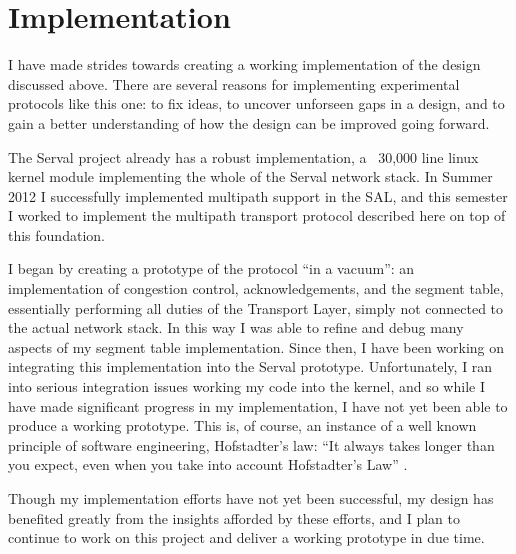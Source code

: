 \section{Implementation}
\label{sec:implementation}

I have made strides towards creating a working implementation of the design discussed above. There are several reasons for implementing experimental protocols like this one: to fix ideas, to uncover unforseen gaps in a design, and to gain a better understanding of how the design can be improved going forward.

The Serval project already has a robust implementation, a ~30,000 line linux kernel module implementing the whole of the Serval network stack. In Summer 2012 I successfully implemented multipath support in the SAL, and this semester I worked to implement the multipath transport protocol described here on top of this foundation.

I began by creating a prototype of the protocol ``in a vacuum'': an implementation of congestion control, acknowledgements, and the segment table, essentially performing all duties of the Transport Layer, simply not connected to the actual network stack. In this way I was able to refine and debug many aspects of my segment table implementation. Since then, I have been working on integrating this implementation into the Serval prototype. Unfortunately, I ran into serious integration issues working my code into the kernel, and so while I have made significant progress in my implementation, I have not yet been able to produce a working prototype. This is, of course, an instance of a well known principle of software engineering, Hofstadter's law: ``It always takes longer than you expect, even when you take into account Hofstadter's Law'' \cite{hofstadter1985godel}.

Though my implementation efforts have not yet been successful, my design has benefited greatly from the insights afforded by these efforts, and I plan to continue to work on this project and deliver a working prototype in due time.